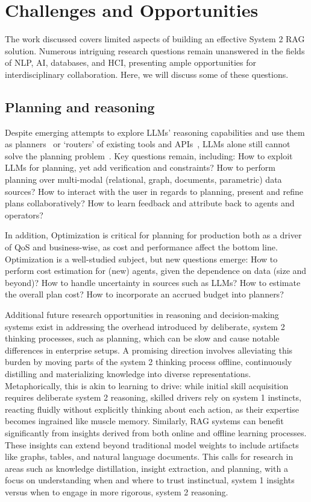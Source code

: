 \section{Challenges and Opportunities}
\label{sec:future}
The work discussed covers limited aspects of building an effective System 2 RAG solution. Numerous intriguing research questions remain unanswered in the fields of NLP, AI, databases, and HCI, presenting ample opportunities for interdisciplinary collaboration. Here, we will discuss some of these questions.
\subsection{Planning and reasoning}
Despite emerging attempts to explore LLMs' reasoning capabilities and use them as planners~\cite{zhao2024large, huang2022language} or `routers' of existing tools and APIs~\cite{liang2024taskmatrix, qin2023toolllm,kim2023llmcompiler}, LLMs alone still cannot solve the planning problem~\cite{kambhampati2024llms,valmeekam2023planning}. Key questions remain, including: How to exploit LLMs for planning, yet add verification and constraints? How to perform planning over multi-modal (relational, graph, documents, parametric) data sources?
How to interact with the user in regards to planning, present and refine plans collaboratively? How to learn feedback and attribute back to agents and operators?


In addition, Optimization is critical for planning for production both as a driver of QoS and business-wise, as cost and performance affect the bottom line. Optimization is a well-studied subject, but new questions emerge: How to perform cost estimation for (new) agents, given the dependence on data (size and beyond)? How to handle uncertainty in sources such as LLMs? How to estimate the overall plan cost? How to incorporate an accrued budget into planners?

Additional future research opportunities in reasoning and decision-making systems exist in addressing the overhead introduced by deliberate, system 2 thinking processes, such as planning, which can be slow and cause notable differences in enterprise setups. A promising direction involves alleviating this burden by moving parts of the system 2 thinking process offline, continuously distilling and materializing knowledge into diverse representations. Metaphorically, this is akin to learning to drive: while initial skill acquisition requires deliberate system 2 reasoning, skilled drivers rely on system 1 instincts, reacting fluidly without explicitly thinking about each action, as their expertise becomes ingrained like muscle memory. Similarly, RAG systems can benefit significantly from insights derived from both online and offline learning processes. These insights can extend beyond traditional model weights to include artifacts like graphs, tables, and natural language documents. This calls for research in areas such as knowledge distillation, insight extraction, and planning, with a focus on understanding when and where to trust instinctual, system 1 insights versus when to engage in more rigorous, system 2 reasoning.
